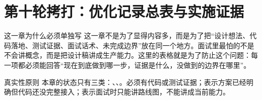 \section{第十轮拷打：优化记录总表与实施证据}

\begin{summaryBox}{这一章为什么必须单独写}
这一章不是为了显得内容多，而是为了把“设计想法、代码落地、测试证据、面试话术、未完成边界”放在同一个地方。面试里最怕的不是不会讲概念，而是把设计稿讲成生产能力。这里的表格就是为了防止这个问题：每一项都必须能回答“现在到底做到哪一步，证据是什么，没做到的边界在哪里”。
\end{summaryBox}

\begin{riskBox}{真实性原则}
本章的状态只有三类：、、。必须有代码或测试证据；表示方案已经明确但代码还没完整接入；表示面试时只能讲路线图，不能讲成当前能力。
\end{riskBox}

